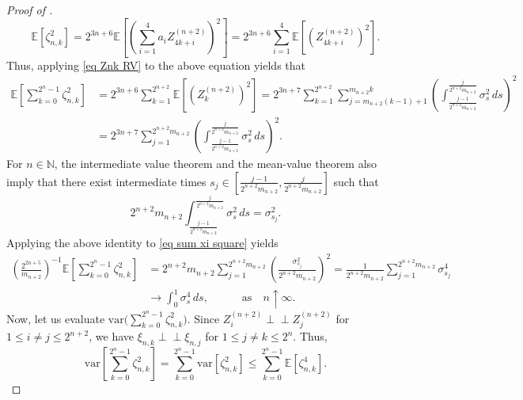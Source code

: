\documentclass[12pt,reqno]{article}
\def\ua{\uparrow}
\numberwithin{equation}{section}
\def\var{\mbox{var}}
\theoremstyle{definition}
\def\ua{\uparrow}
\newcommand{\indep}{\perp \!\!\! \perp}
\newcommand{\bE}{\mathbb{E}}
\newcommand{\bN}{\mathbb{N}}
\begin{document}
\begin{proof}[Proof of ]
\begin{equation*}
		\bE\left[\zeta_{n,k}^2\right] = 2^{3n+6}\bE\left[\left(\sum_{i = 1}^{4} a_i Z^{(n+2)}_{4k+i}\right)^2\right] = 2^{3n+6}\sum_{i = 1}^{4}\bE\left[(Z^{(n+2)}_{4k+i})^2\right].
	\end{equation*}
	Thus, applying \eqref{eq Znk RV} to the above equation yields that 
	\begin{equation}\label{eq sum xi square}
		\begin{split}
			\bE\left[\sum_{k = 0}^{2^n-1}\zeta_{n,k}^2\right] &= 2^{3n+6}\sum_{k = 1}^{2^{n+2}}\bE\left[\left(Z^{(n+2)}_k\right)^2\right] = 2^{3n+7}\sum_{k = 1}^{2^{n+2}}\sum_{j = m_{n+2}(k-1)+1}^{m_{n+2} k}\left(\int^{\frac{j}{2^{n+2} m_{n+2}}}_{\frac{j-1}{2^{n+2} m_{n+2}}}\sigma^2_s\,ds\right)^2 \\&= 2^{3n+7}\sum_{j = 1}^{2^{n+2}m_{n+2}}\left(\int^{\frac{j}{2^{n+2} m_{n+2}}}_{\frac{j-1}{2^{n+2} m_{n+2}}}\sigma^2_s\,ds\right)^2.
		\end{split}
	\end{equation}
	For $n \in \bN$, the intermediate value theorem and the mean-value theorem also imply that there exist intermediate times $s_j \in [\frac{j-1}{2^{n+2}m_{n+2}}, \frac{j}{2^{n+2}m_{n+2}}]$ such that 
	\begin{equation*}
		2^{n+2}m_{n+2}\int^{\frac{j}{2^{n+2} m_{n+2}}}_{\frac{j-1}{2^{n+2} m_{n+2}}}\sigma^2_s\,ds = \sigma^2_{s_j}.
	\end{equation*}
	Applying the above identity to \eqref{eq sum xi square} yields 
	\begin{equation*}
		\begin{split}
			\left(\frac{2^{2n+5}}{m_{n+2}}\right)^{-1}\bE\left[\sum_{k = 0}^{2^n-1}\zeta_{n,k}^2\right] &= 2^{n+2}m_{n+2}\sum_{j = 1}^{2^{n+2}m_{n+2}} \left(\frac{\sigma^2_{s_j}}{2^{n+2}m_{n+2}}\right)^2 = \frac{1}{2^{n+2}m_{n+2}}\sum_{j = 1}^{2^{n+2}m_{n+2}}\sigma^4_{s_j} \\
			& \longrightarrow \int_0^1 \sigma^4_s \, ds, \qquad \quad \text{as} \quad n \ua \infty.
		\end{split}
	\end{equation*}
	Now, let us evaluate $\var\big(\sum_{k = 0}^{2^n-1}\zeta_{n,k}^2\big)$. Since $Z_i^{(n+2)} \indep Z_j^{(n+2)}$ for $1 \le i \neq j \le 2^{n+2}$, we have $\xi_{n,k} \indep \xi_{n,j}$ for $1 \le j \neq k \le 2^n$. Thus, 
	\begin{equation*}
		\var\left[\sum_{k = 0}^{2^n-1}\zeta_{n,k}^2\right] = \sum_{k = 0}^{2^n-1}\var\left[\zeta_{n,k}^2\right] \le \sum_{k = 0}^{2^n-1}\bE\left[\zeta^4_{n,k}\right].
	\end{equation*}  

\end{proof}
\end{document}
